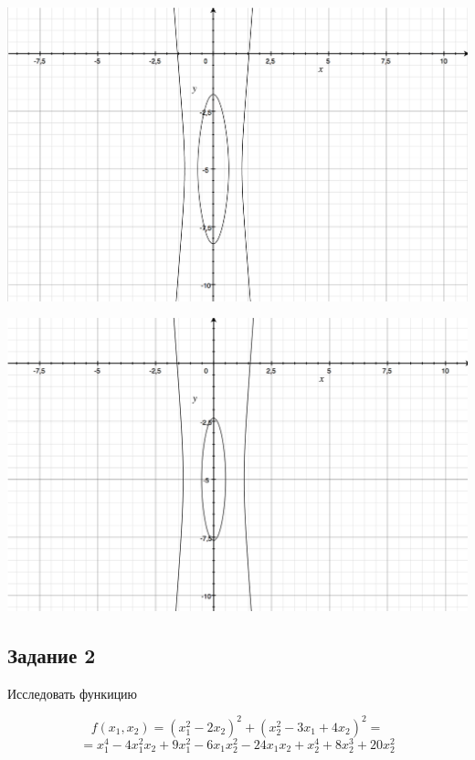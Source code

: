\documentclass[a4paper, 12pt]{article}   	%
\begin{document}
\begin{center}
        \begin{minipage}{0.47\linewidth}
            \includegraphics[width=\linewidth]{img/1_r3}
        \end{minipage}
        \begin{minipage}{0.47\linewidth}
            \includegraphics[width=\linewidth]{img/1_r4}
        \end{minipage}
    \end{center}
    
\subsection{Задание 2}

    Исследовать функицию
    
    \begin{equation*}
        f(x_1, x_2) = (x_1^2 - 2x_2)^2 + (x_2^2 - 3x_1 + 4x_2)^2 = 
    \end{equation*}
    \begin{equation*}
        = x_1^4-4x_1^2 x_2+9x_1^2-6x_1x_2^2 - 24x_1 x_2 + x_2^4 + 8 x_2^3 + 20 x_2^2
    \end{equation*}
\end{document}
